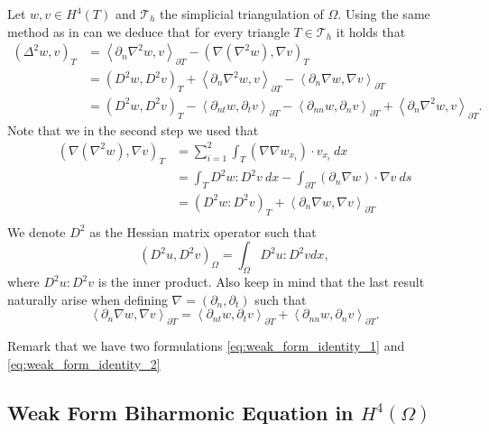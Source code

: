 Let $w,v \in  H^{4} \left( T  \right) $ and $\mathcal{T}_{h} $ the simplicial triangulation of $\Omega$. Using the same method as in \cite{gu2012c0, brenner2012quadratic} can we
deduce that for every triangle $T \in  \mathcal{T}_{h} $ it holds that
\begin{align}
        \left( \Delta  ^{2} w, v \right) _{T} &= \left< \partial _{n} \nabla ^2 w, v \right>_{\partial T} - \left( \nabla \left( \nabla ^2 w
 \right), \nabla  v  \right)_{T} \nonumber   \\
\label{eq:weak_form_identity_1}
 &= \left( D^2w, D^2v \right)_{T} + \left< \partial _{n} \nabla ^2 w, v \right>_{\partial T}  - \left<\partial _{n}
 \nabla w, \nabla v \right>_{\partial T} \\
\label{eq:weak_form_identity_2}
 &=  \left( D^2 w, D^2 v \right)_{T} - \left<\partial _{nt} w, \partial _{t} v \right>_{\partial T} - \left<\partial
 _{nn} w, \partial _{n} v \right> _{\partial T} +  \left<\partial _{n} \nabla ^2 w, v \right>_{\partial T}
.\end{align}
Note that we in the second step we used that
\[
    \begin{split}
\left( \nabla \left( \nabla ^2 w \right), \nabla  v  \right)_{T} & = \sum_{i=1}^{2}  \int_{T}^{} \left( \nabla \nabla w_{x_{i}} \right)\cdot  v_{x_{i}} \ dx    \\
 & =  \int_{T}^{} D^2w: D^2v \ dx - \int_{\partial T}^{} \left( \partial _{n} \nabla w \right)
\cdot  \nabla v  \ ds \\
&= \left( D^2 w : D^2v  \right) _{ T} + \left<\partial _{n} \nabla w, \nabla v \right>_{\partial T }  \\
    \end{split}
\]
We denote $D^2$ as the Hessian matrix operator such that
$$( D^2u, D^2v )_{\Omega } = \int_{\Omega }^{} D^{2}u : D^2v  dx,$$
where $D^2u:D^2v$ is the inner product. Also keep in mind that the last result naturally arise when defining $\nabla  = \left( \partial _{n}, \partial _{t} \right) $ such that
\[
\left<\partial _{n} \nabla w, \nabla v \right>_{\partial T} = \left<\partial _{nt} w, \partial _{t} v\right> _{\partial
T} + \left< \partial _{nn} w, \partial _{n} v  \right> _{\partial T} .
\]

Remark that we have two formulations \eqref{eq:weak_form_identity_1} and \eqref{eq:weak_form_identity_2}
\subsection{  Weak Form Biharmonic Equation in $H^{4}\left( \Omega  \right) $}%
\label{sub:continious_weak_form_of_biharmonic_equation}

